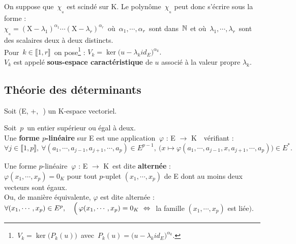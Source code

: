 \vspace{1.8cm}

On suppose que \(\,\chi_{_u}\) est scindé sur K. Le polynôme \(\,\chi_{_u}\) peut donc s'écrire sous la forme :\vspace{0.1cm}\\
\(\displaystyle \chi_{_u}=(\text{X}-\lambda_1)^{\alpha_1}\cdots(\text{X}-\lambda_r)^{\alpha_r}\,\) où \(\,\alpha_1,\cdots,\alpha_r\,\) sont dans \(\,\mathbb{N}\)\expo{*} et où \(\,\lambda_1,\cdots,\lambda_r\,\) sont des scalaires deux à deux distincts.\vspace{0.1cm}\\
Pour \(\,k\in \llbracket 1,r \rrbracket\,\) on pose\footnote{\(\, V_k=\ker\bigl(P_k(u)\bigr)\,\) avec \(\displaystyle \, P_k (u)= \bigl( u-\lambda_kid_E\bigr)^{\alpha_k}\).} : \(\displaystyle V_k = \ker\bigl(u-\lambda_kid_E\bigr)^{\alpha_k}.\)\vspace{0.1cm}\\
$V_k$ est appelé \textbf{sous-espace caractéristique} de $u$ associé à la valeur propre $\lambda_k$.

\newpage

\subsection{Théorie des déterminants}

\vspace{0.7cm}

\begin{center}
    Soit (E, +,\ \lce\,) un K-espace vectoriel.
\end{center}

\vspace{1.3cm}

Soit $\,p\,$ un entier supérieur ou égal à deux.\\
Une \textbf{forme $p$-linéaire} sur E est une application \(\ \varphi \) : E \(\to\) K\ \ vérifiant :\vspace{0.1cm}\\
\(\forall j\in \llbracket 1,p \rrbracket,\ \forall (a_1,\cdots,a_{j-1},a_{j+1},\cdots,a_p)\in E^{p-1},\ \bigl( x\mapsto \varphi(a_1,\cdots,a_{j-1}, x,a_{j+1},\cdots,a_p) \bigr) \in E^*. \)

\vspace{1.8cm}

Une forme $p$-linéaire \(\ \varphi \) : E \(\to\) K\ est dite \textbf{alternée} \ssi :\\
\( \varphi(x_1,\cdots, x_p)=0_K  \) pour tout $p$-uplet \((x_1,\cdots, x_p)\) de E dont au moins deux vecteurs sont égaux.\vspace{0.2cm}\\
Ou, de manière équivalente, $\varphi$ est dite alternée \ssi :\vspace{0.1cm}\\
\(\forall(x_1,\cdots,x_p)\in E^p,\quad \Bigl(\,\varphi(x_1,\cdots,x_p)=0_K \ \Leftrightarrow \ \) la famille $(x_1,\cdots,x_p)$ est liée$\Bigr)$. 

